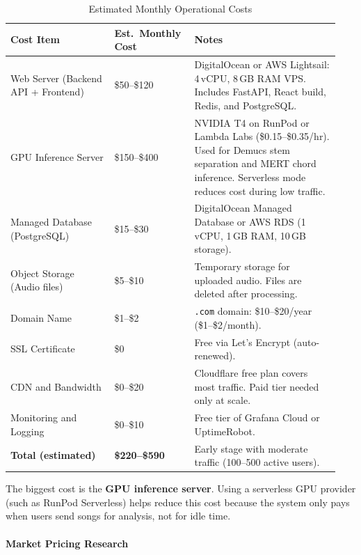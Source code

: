 \documentclass[a4paper]{article}
\begin{document}
\begin{longtable}{@{}
    >{\raggedright\arraybackslash}p{0.30\linewidth}
    >{\raggedright\arraybackslash}p{0.22\linewidth}
    >{\raggedright\arraybackslash}p{0.42\linewidth}@{}}

    \caption{Estimated Monthly Operational Costs}\label{tab:op_costs} \\
    \toprule
    \textbf{Cost Item} & \textbf{Est.\ Monthly Cost} & \textbf{Notes} \\
    \midrule
    \endfirsthead
    \bottomrule
    \endlastfoot

    Web Server (Backend API + Frontend) & \$50--\$120 & DigitalOcean or AWS Lightsail: 4\,vCPU, 8\,GB RAM VPS. Includes FastAPI, React build, Redis, and PostgreSQL. \\
    \addlinespace
    GPU Inference Server & \$150--\$400 & NVIDIA T4 on RunPod or Lambda Labs (\$0.15--\$0.35/hr). Used for Demucs stem separation and MERT chord inference. Serverless mode reduces cost during low traffic. \\
    \addlinespace
    Managed Database (PostgreSQL) & \$15--\$30 & DigitalOcean Managed Database or AWS RDS (1\,vCPU, 1\,GB RAM, 10\,GB storage). \\
    \addlinespace
    Object Storage (Audio files) & \$5--\$10 & Temporary storage for uploaded audio. Files are deleted after processing. \\
    \addlinespace
    Domain Name & \$1--\$2 & \texttt{.com} domain: \$10--\$20/year (\$1--\$2/month). \\
    \addlinespace
    SSL Certificate & \$0 & Free via Let's Encrypt (auto-renewed). \\
    \addlinespace
    CDN and Bandwidth & \$0--\$20 & Cloudflare free plan covers most traffic. Paid tier needed only at scale. \\
    \addlinespace
    Monitoring and Logging & \$0--\$10 & Free tier of Grafana Cloud or UptimeRobot. \\
    \addlinespace
    \textbf{Total (estimated)} & \textbf{\$220--\$590} & Early stage with moderate traffic (100--500 active users). \\
\end{longtable}

The biggest cost is the \textbf{GPU inference server}. Using a serverless GPU provider (such as RunPod Serverless) helps reduce this cost because the system only pays when users send songs for analysis, not for idle time.

\paragraph{Market Pricing Research}
\end{document}
